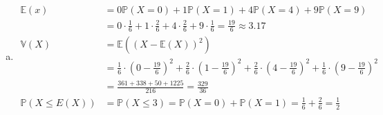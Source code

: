 \documentclass{article}
\newcommand{\E}{\mathbb{E}}
\newcommand{\V}{\mathbb{V}}
\renewcommand{\P}{\mathbb{P}}
\begin{document}
\begin{enumerate}[a)]
            \item
                \begin{align*}
                    \E(x)&=0\P(X=0)+1\P(X=1)+4\P(X=4)+9\P(X=9)\\
                    &=0\cdot\frac{1}{6}+1\cdot\frac{2}{6}
                    +4\cdot\frac{2}{6}+9\cdot\frac{1}{6}
                    =\frac{19}{6}\approx 3.17\\
                    \V(X)&=\E((X-\E(X))^2)\\
                    &=\frac{1}{6}\cdot\left(0-\frac{19}{6}\right)^2
                    +\frac{2}{6}\cdot\left(1-\frac{19}{6}\right)^2
                    +\frac{2}{6}\cdot\left(4-\frac{19}{6}\right)^2
                    +\frac{1}{6}\cdot\left(9-\frac{19}{6}\right)^2\\
                    &=\frac{361+338+50+1225}{216}=\frac{329}{36}\\
                    \P(X\leq E(X))&=\P(X\leq 3)=\P(X=0)+\P(X=1)
                    =\frac{1}{6}+\frac{2}{6}=\frac{1}{2}
                \end{align*}
    \end{enumerate}
\end{document}
